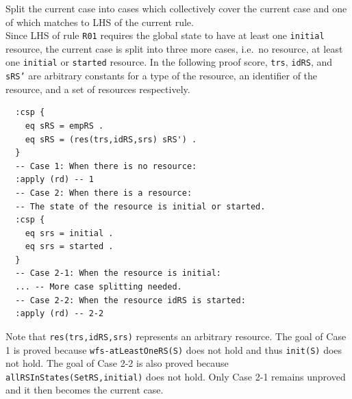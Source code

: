 \documentclass[12pt]{report}
\newcommand{\stt}[1]{{\small{\tt {#1}}}}
\begin{document}
 Split the current case into cases which
collectively cover the current case and one of which matches to LHS of
the current rule. \\ Since LHS of rule {\tt R01} requires the global
state to have at least one {\tt initial} resource, the current case is split
into three more cases, i.e.\ no resource, at least one {\tt initial}
or {\tt started} resource. In the following proof score, {\tt trs},
{\tt idRS}, and {\tt sRS'} are arbitrary constants for a type of the
resource, an identifier of the resource, and a set of resources
respectively.
\small
\begin{verbatim}
  :csp { 
    eq sRS = empRS .
    eq sRS = (res(trs,idRS,srs) sRS') .
  }
  -- Case 1: When there is no resource:
  :apply (rd) -- 1
  -- Case 2: When there is a resource:
  -- The state of the resource is initial or started.
  :csp { 
    eq srs = initial .
    eq srs = started .
  }
  -- Case 2-1: When the resource is initial:
  ... -- More case splitting needed.
  -- Case 2-2: When the resource idRS is started:
  :apply (rd) -- 2-2
\end{verbatim}
\normalsize
Note that \stt{res(trs,idRS,srs)} represents an arbitrary resource.
The goal of Case 1 is proved because \stt{wfs-atLeastOneRS(S)} does
not hold and thus \stt{init(S)} does not hold. The goal of Case 2-2 is
also proved because \stt{allRSInStates(SetRS,initial)} does not hold.
Only Case 2-1 remains unproved and it then becomes the current case.\\
\end{document}
